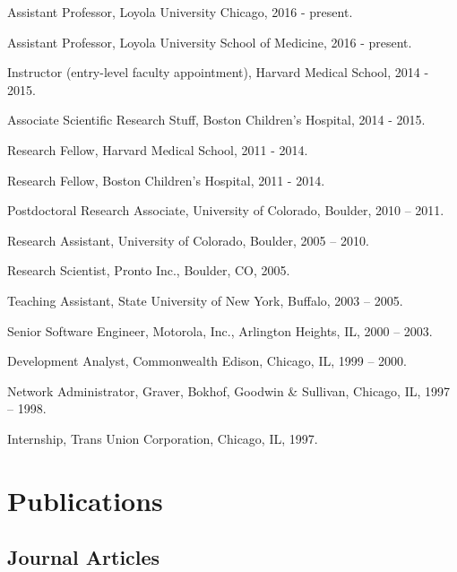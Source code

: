 \documentclass[letterpaper]{article}
\renewenvironment{itemize}{
  \begin{list}{}{
    \setlength{\leftmargin}{1.5em}
  }
}{
  \end{list}
}
\begin{document}
\begin{itemize}
\item Assistant Professor, Loyola University Chicago, 2016 - present.
\item Assistant Professor, Loyola University School of Medicine, 2016 - present.
\item Instructor (entry-level faculty appointment), Harvard Medical School, 2014 - 2015.
\item Associate Scientific Research Stuff, Boston Children's Hospital, 2014 - 2015.
\item Research Fellow, Harvard Medical School, 2011 - 2014.
\item Research Fellow, Boston Children's Hospital, 2011 - 2014.
\item Postdoctoral Research Associate, University of Colorado, Boulder, 2010 -- 2011.
\item Research Assistant, University of Colorado, Boulder, 2005 -- 2010.
\item Research Scientist, Pronto Inc., Boulder, CO, 2005.
\item Teaching Assistant, State University of New York, Buffalo, 2003 -- 2005.
\item Senior Software Engineer, Motorola, Inc., Arlington Heights, IL, 2000 -- 2003.
\item Development Analyst, Commonwealth Edison, Chicago, IL, 1999 -- 2000.
\item Network Administrator, Graver, Bokhof, Goodwin \& Sullivan, Chicago, IL, 1997 -- 1998.
\item Internship, Trans Union Corporation, Chicago, IL, 1997.
\end{itemize}

\section*{Publications}

\subsection*{Journal Articles}
\end{document}
